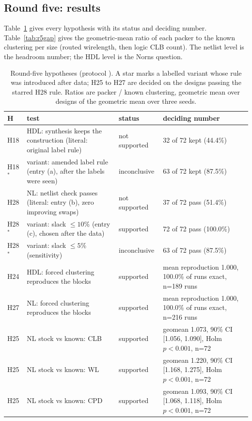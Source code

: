 
\subsection{Round five: results}
\label{sec:r5-results}
Table~\ref{tab:r5status} gives every hypothesis with its status and deciding number. Table~\ref{tab:r5gap} gives the geometric-mean ratio of each packer to the known clustering per size (routed wirelength, then logic CLB count). The netlist level is the headroom number; the HDL level is the Norns question.
\begin{table}[t]
\caption{Round-five hypotheses (protocol ). A star marks a labelled variant whose rule was introduced after data; H25 to H27 are decided on the designs passing the starred H28 rule. Ratios are packer / known clustering, geometric mean over designs of the geometric mean over three seeds.}
\label{tab:r5status}
\centering\scriptsize
\begin{tabular}{@{}lp{4.4cm}p{2.6cm}p{9.0cm}@{}}
\toprule
H & test & status & deciding number \\
\midrule
H18 & HDL: synthesis keeps the construction (literal: original label rule) & not supported & 32 of 72 kept (44.4\%) \\
H18$^\ast$ & variant: amended label rule (entry (a), after the labels were seen) & inconclusive & 63 of 72 kept (87.5\%) \\
H28 & NL: netlist check passes (literal: entry (b), zero improving swaps) & not supported & 37 of 72 pass (51.4\%) \\
H28$^\ast$ & variant: slack $\le 10$\% (entry (c), chosen after the data) & supported & 72 of 72 pass (100.0\%) \\
H28$^\ast$ & variant: slack $\le 5$\% (sensitivity) & inconclusive & 63 of 72 pass (87.5\%) \\
H24 & HDL: forced clustering reproduces the blocks & supported & mean reproduction 1.000, 100.0\% of runs exact, n=189 runs \\
H27 & NL: forced clustering reproduces the blocks & supported & mean reproduction 1.000, 100.0\% of runs exact, n=216 runs \\
H25 & NL stock vs known: CLB & supported & geomean 1.073, 90\% CI [1.056, 1.090], Holm $p<0.001$, n=72 \\
H25 & NL stock vs known: WL & supported & geomean 1.220, 90\% CI [1.168, 1.275], Holm $p<0.001$, n=72 \\
H25 & NL stock vs known: CPD & supported & geomean 1.093, 90\% CI [1.068, 1.118], Holm $p<0.001$, n=72 \\

\end{tabular}
\end{table}
